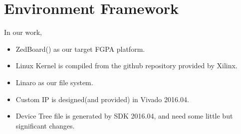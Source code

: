 \chapter{Environment Framework}
\label{cha:Environment Framework}

In our work, 
\begin{itemize}
\item ZedBoard() as our target FGPA platform.
\item Linux Kernel is compiled from the github repository provided by Xilinx.
\item Linaro as our file system.
\item Custom IP is designed(and provided) in Vivado 2016.04.
\item Device Tree file is generated by SDK 2016.04, and need some little but 
	  significant changes.

\end{itemize}






